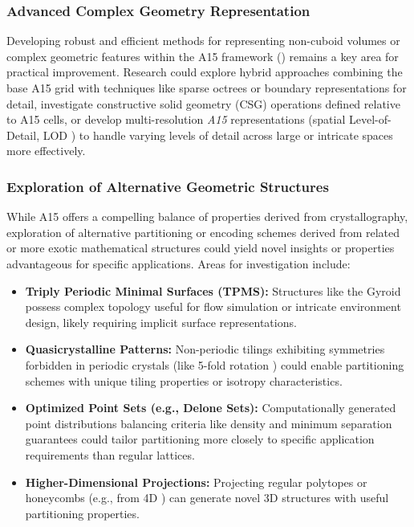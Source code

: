 \documentclass[10pt]{article}
\def\AAAB{\textit{A15}}
\begin{document}
\subsubsection{Advanced Complex Geometry Representation}\label{subsubsec-outlook-complex}
Developing robust and efficient methods for representing non-cuboid volumes or complex geometric features within the A15 framework () remains a key area for practical improvement. Research could explore hybrid approaches combining the base A15 grid with techniques like sparse octrees or boundary representations for detail, investigate constructive solid geometry (CSG) operations defined relative to A15 cells, or develop multi-resolution \AAAB{} representations (spatial Level-of-Detail, LOD \cite{Luebke2002}) to handle varying levels of detail across large or intricate spaces more effectively.

\subsubsection{Exploration of Alternative Geometric Structures}\label{subsubsec-outlook-geometry}
While A15 offers a compelling balance of properties derived from crystallography, exploration of alternative partitioning or encoding schemes derived from related or more exotic mathematical structures could yield novel insights or properties advantageous for specific applications. Areas for investigation include:
\begin{itemize} \itemsep0pt
    \item \textbf{Triply Periodic Minimal Surfaces (TPMS):} Structures like the Gyroid \cite{Schoen1970} possess complex topology useful for flow simulation or intricate environment design, likely requiring implicit surface representations.
    \item \textbf{Quasicrystalline Patterns:} Non-periodic tilings exhibiting symmetries forbidden in periodic crystals (like 5-fold rotation \cite{Shechtman1984}) could enable partitioning schemes with unique tiling properties or isotropy characteristics.
    \item \textbf{Optimized Point Sets (e.g., Delone Sets):} Computationally generated point distributions balancing criteria like density and minimum separation guarantees \cite{Gruber2007} could tailor partitioning more closely to specific application requirements than regular lattices.
    \item \textbf{Higher-Dimensional Projections:} Projecting regular polytopes or honeycombs (e.g., from 4D \cite{Coxeter1973}) can generate novel 3D structures with useful partitioning properties.
\end{itemize}
\end{document}
